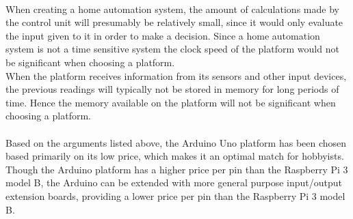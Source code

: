 \\
When creating a home automation system, the amount of calculations made by the control unit will presumably be relatively small, since it would only evaluate the input given to it in order to make a decision. Since a home automation system is not a time sensitive system the clock speed of the platform would not be significant when choosing a platform.
\\
When the platform receives information from its sensors and other input devices, the previous readings will typically not be stored in memory for long periods of time. Hence the memory available on the platform will not be significant when choosing a platform. 
\\\\
Based on the arguments listed above, the Arduino Uno platform has been chosen based primarily on its low price, which makes it an optimal match for hobbyists. Though the Arduino platform has a higher price per pin than the Raspberry Pi 3 model B, the Arduino can be extended with more general purpose input/output extension boards, providing a lower price per pin than the Raspberry Pi 3 model B.

